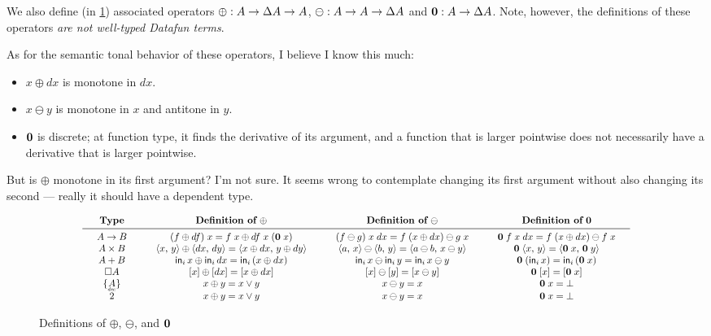 \documentclass{rntz}
\begin{document}
We also define (in \cref{fig:operators}) associated operators $\oplus : A \to
\Delta A \to A$, $\ominus : A \to A \to \Delta A$ and $\mathbf{0} : A \to \Delta A$. Note,
however, the definitions of these operators \emph{are not well-typed Datafun
  terms}. 

As for the semantic tonal behavior of these operators, I believe I know this
much:
\begin{itemize}
\item $x \oplus dx$ is monotone in $dx$.
\item $x \ominus y$ is monotone in $x$ and antitone in $y$.
\item $\mathbf{0}$ is discrete; at function type, it finds the derivative of its
  argument, and a function that is larger pointwise does not necessarily have a
  derivative that is larger pointwise.
\end{itemize}

But is $\oplus$ monotone in its first argument? I'm not sure. It seems wrong to
contemplate changing its first argument without also changing its second ---
really it should have a dependent type.

\begin{figure*}
  \[
  \scalebox{0.85}{\(
    \arraycolsep=1.5em
    \begin{array}{cccc}
      \textbf{Type}
      & {\textbf{Definition of}~\oplus}
      & {\textbf{Definition of}~\ominus}
      & {\textbf{Definition of}~\zero}
      \\\midrule
      A \to B
      & (f \oplus df)\; x = f\; x \oplus df\; x\; (\zero\; x)
      & (f \ominus g)\; x \;dx = f\; (x \oplus dx) \ominus g \; x
      & \zero\; f\; x\; dx = f\; (x \oplus dx) \ominus f\; x
      \\
      A \x B
      & \pair{x}{y} \oplus \pair{dx}{dy} = \pair{x \oplus dx}{y \oplus dy}
      & \pair{a}{x} \ominus \pair{b}{y} = \pair{a \ominus b}{x \ominus y}
      & \zero \; \pair{x}{y} = \pair{\zero\; x}{\zero\; y}
      \\
      A + B
      & \inj{i}{x} \oplus \inj{i}{dx} = \inj{i}{(x \oplus dx)}
      & \inj{i}{x} \ominus \inj{i}{y} = \inj{i}{x \ominus y}
      & \zero\; (\inj{i}{x}) = \inj{i}{(\zero\;x)}
      \\
      \Disc{A}
      & \disc{x} \oplus \disc{dx} = \disc{x \oplus dx}
      & \disc{x} \ominus \disc{y} = \disc{x \ominus y}
      & \zero\; \disc{x} = \disc{\zero\; x}
      \\
      \Seteq{A}
      & x \oplus y = x \vee y
      & x \ominus y = x
      & \zero\; x = \unit
      \\
      \tbool
      & x \oplus y = x \vee y
      & x \ominus y = x
      & \zero\; x = \unit
    \end{array}
    \)}
  \]
  \caption{Definitions of $\oplus$, $\ominus$, and $\mathbf{0}$}
  \label{fig:operators}
\end{figure*}
\end{document}
